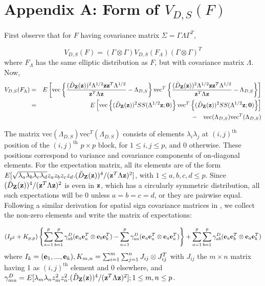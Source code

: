 \section*{Appendix A: \textbf{Form of $V_{D,S}(F)$}}
First observe that for $F$ having covariance matrix $\Sigma = \Gamma\Lambda\Gamma^T$,

$$ V_{D,S}(F)  = (\Gamma \otimes \Gamma) V_{D,S}(F_\Lambda) (\Gamma \otimes \Gamma)^T$$
where $F_\Lambda$ has the same elliptic distribution as $F$, but with covariance matrix $\Lambda$. Now,
\begin{eqnarray*}
V_{D,S} (F_\Lambda) &=& E \left[ \text{vec} \left\{ \frac{(\tilde D_{\mathbf{Z}} ({\bf{z}}))^2 \Lambda^{1/2} {\bf{z}}{\bf{z}}^T \Lambda^{1/2}}{{\bf{z}}^T\Lambda{\bf{z}}} - \Lambda_{D,S} \right\} \text{vec}^T \left\{ \frac{(\tilde D_{\mathbf{Z}} ({\bf{z}}))^2 \Lambda^{1/2} {\bf{z}}{\bf{z}}^T \Lambda^{1/2}}{{\bf{z}}^T\Lambda{\bf{z}}} - \Lambda_{D,S} \right\} \right]\\
&=& E \left[ \text{vec} \left\{ (\tilde D_{\mathbf{Z}} ({\bf{z}}))^2 SS(\Lambda^{1/2}{\bf{z}}; \bf0) \right\} \text{vec}^T \left\{ (\tilde D_{\mathbf{Z}} ({\bf{z}}))^2 SS(\Lambda^{1/2}{\bf{z}}; \bf0) \right\} \right]\\
&& - \quad \text{vec}(\Lambda_{D,S}) \text{vec}^T(\Lambda_{D,S})
\end{eqnarray*}

The matrix $\text{vec}(\Lambda_{D,S}) \text{vec}^T(\Lambda_{D,S})$ consists of elements $\lambda_i\lambda_j$ at $(i,j)^\text{th}$ position of the $(i,j)^\text{th}$ $p \times p$ block, for $1 \leq i,j \leq p$, and 0 otherwise. These positions correspond to variance and covariance components of on-diagonal elements. For the expectation matrix, all its elements are of the form $E[\sqrt{\lambda_a \lambda_b \lambda_c \lambda_d} z_a z_b z_c z_d . (\tilde D_{\mathbf{Z}} ({\bf{z}}))^4 / ({\bf{z}}^T \Lambda {\bf{z}})^2]$, with $1 \leq a,b,c,d \leq p$. Since $(\tilde D_{\mathbf{Z}} ({\bf{z}}))^4 / ({\bf{z}}^T \Lambda {\bf{z}})^2$ is even in ${\bf{z}}$, which has a circularly symmetric distribution, all such expectations will be 0 unless $a=b=c=d$, or they are pairwise equal. Following a similar derivation for spatial sign covariance matrices in \cite{magyar14}, we collect the non-zero elements and write the matrix of expectations:

$$ (I_{p^2} + K_{p,p}) \left\{ \sum_{a=1}^p \sum_{b=1}^p \gamma^D_{ab} ({\bf{e}}_a {\bf{e}}_a^T \otimes  {\bf{e}}_b {\bf{e}}_b^T) - \sum_{a=1}^p \gamma^D_{aa} ({\bf{e}}_a {\bf{e}}_a^T \otimes  {\bf{e}}_a {\bf{e}}_a^T) \right\} + \sum_{a=1}^p \sum_{b=1}^p \gamma^D_{ab} ({\bf{e}}_a {\bf{e}}_b^T \otimes  {\bf{e}}_a {\bf{e}}_b^T) $$
where $I_k = ({\bf{e}}_1,...,{\bf{e}}_k), K_{m,n} = \sum_{i=1}^m \sum_{j=1}^n J_{ij} \otimes J_{ij}^T$ with $J_{ij}$ the $m \times n$ matrix having 1 as $(i,j)^\text{th}$ element and 0 elsewhere, and $\gamma^D_{mn} = E[ \lambda_m \lambda_n z_m^2 z_n ^2 . (\tilde D_{\mathbf{Z}} ({\bf{z}}))^4 / ({\bf{z}}^T \Lambda {\bf{z}})^2]; 1 \leq m,n \leq p$.


